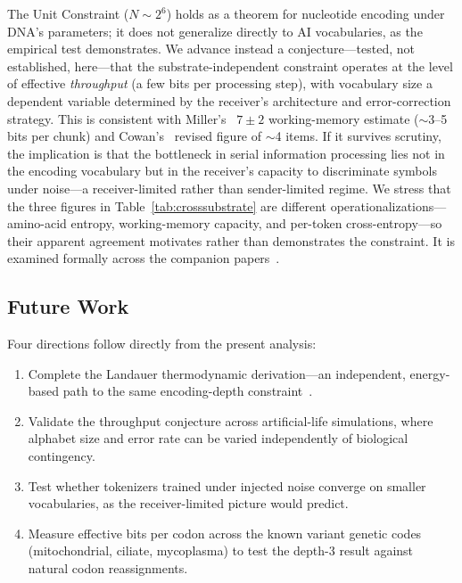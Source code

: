 \documentclass[11pt]{article}
\begin{document}
The Unit Constraint ($N \sim 2^6$) holds as a theorem for nucleotide encoding under DNA's parameters; it does not generalize directly to AI vocabularies, as the empirical test demonstrates. We advance instead a conjecture---tested, not established, here---that the substrate-independent constraint operates at the level of effective \emph{throughput} (a few bits per processing step), with vocabulary size a dependent variable determined by the receiver's architecture and error-correction strategy. This is consistent with Miller's~\cite{miller1956} $7 \pm 2$ working-memory estimate ($\sim$3--5 bits per chunk) and Cowan's~\cite{cowan2001} revised figure of $\sim$4 items. If it survives scrutiny, the implication is that the bottleneck in serial information processing lies not in the encoding vocabulary but in the receiver's capacity to discriminate symbols under noise---a receiver-limited rather than sender-limited regime. We stress that the three figures in Table~\ref{tab:crosssubstrate} are different operationalizations---amino-acid entropy, working-memory capacity, and per-token cross-entropy---so their apparent agreement motivates rather than demonstrates the constraint. It is examined formally across the companion papers~\cite{whitmer2026rlf,whitmer2026tb,whitmer2026sdb,whitmer2026dd,whitmer2026ic}.

\subsection{Future Work}

Four directions follow directly from the present analysis:
\begin{enumerate}
    \item Complete the Landauer thermodynamic derivation---an independent, energy-based path to the same encoding-depth constraint~\cite{landauer1961}.
    \item Validate the throughput conjecture across artificial-life simulations, where alphabet size and error rate can be varied independently of biological contingency.
    \item Test whether tokenizers trained under injected noise converge on smaller vocabularies, as the receiver-limited picture would predict.
    \item Measure effective bits per codon across the known variant genetic codes (mitochondrial, ciliate, mycoplasma) to test the depth-3 result against natural codon reassignments.
\end{enumerate}
\end{document}

